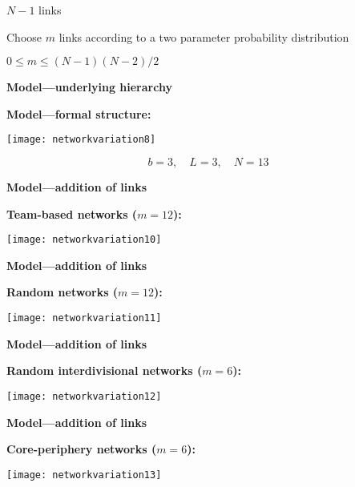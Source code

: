         $N-1$ links
      
    
      
       
        Choose $m$ links according to a
        two parameter probability distribution
       
        $ 0 \le m \le (N-1)(N-2)/2 $
      
    
    
  





  \textbf{Model---underlying hierarchy}

  \textbf{Model---formal structure:}
    \begin{center}
      \texttt{[image: networkvariation8]}
    \end{center}
    $$ 
    b=3, \quad  L=3, \quad N=13
    $$
  


  \textbf{Model---addition of links}

  \textbf{Team-based networks ($m=12$):}
    \begin{center}
      \texttt{[image: networkvariation10]}
    \end{center}
  
    

  \textbf{Model---addition of links}

  \textbf{Random networks ($m=12$):}
    \begin{center}
      \texttt{[image: networkvariation11]}
    \end{center}
  


  \textbf{Model---addition of links}

  \textbf{Random interdivisional networks ($m=6$):}
    \begin{center}
      \texttt{[image: networkvariation12]}
    \end{center}
  


  \textbf{Model---addition of links}

  \textbf{Core-periphery networks ($m=6$):}
    \begin{center}
      \texttt{[image: networkvariation13]}
    \end{center}
  


